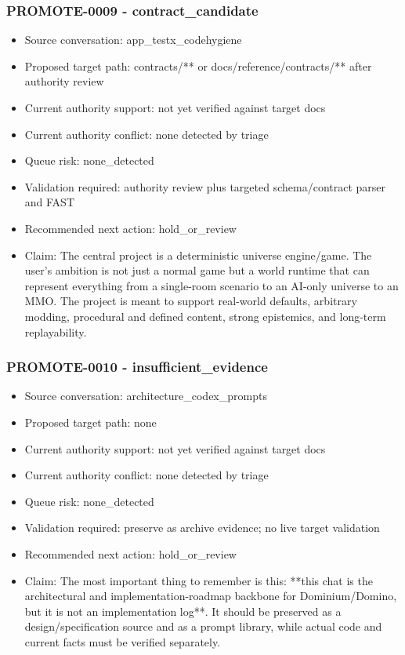 \documentclass[11pt,a4paper]{report}
\begin{document}
\subsubsection{PROMOTE-0009 - contract\_candidate}

\begin{itemize}
\item Source conversation: app\_testx\_codehygiene
\item Proposed target path: contracts/** or docs/reference/contracts/** after authority review
\item Current authority support: not yet verified against target docs
\item Current authority conflict: none detected by triage
\item Queue risk: none\_detected
\item Validation required: authority review plus targeted schema/contract parser and FAST
\item Recommended next action: hold\_or\_review
\item Claim: The central project is a deterministic universe engine/game. The user's ambition is not just a normal game but a world runtime that can represent everything from a single-room scenario to an AI-only universe to an MMO. The project is meant to support real-world defaults, arbitrary modding, procedural and defined content, strong epistemics, and long-term replayability.
\end{itemize}

\subsubsection{PROMOTE-0010 - insufficient\_evidence}

\begin{itemize}
\item Source conversation: architecture\_codex\_prompts
\item Proposed target path: none
\item Current authority support: not yet verified against target docs
\item Current authority conflict: none detected by triage
\item Queue risk: none\_detected
\item Validation required: preserve as archive evidence; no live target validation
\item Recommended next action: hold\_or\_review
\item Claim: The most important thing to remember is this: **this chat is the architectural and implementation-roadmap backbone for Dominium/Domino, but it is not an implementation log**. It should be preserved as a design/specification source and as a prompt library, while actual code and current facts must be verified separately.
\end{itemize}
\end{document}
